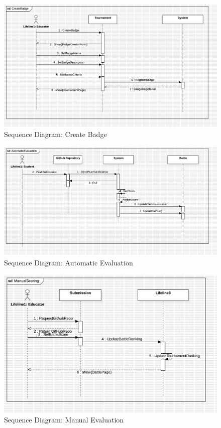 \begin{figure}[Htbp!]
    \centering
    \includegraphics[width=\textwidth]{Graphics/Sequence Diagrams/CreateBadge.png}
    \caption{Sequence Diagram: Create Badge}
    \label{fig:CreateBadge}
\end{figure}
\newpage

\begin{figure}[Htbp!]
    \centering
    \includegraphics[width=\textwidth]{Graphics/Sequence Diagrams/AutomaticEvaluation.png}
    \caption{Sequence Diagram: Automatic Evaluation}
    \label{fig:AutoEval}
\end{figure}


\begin{figure}[Htbp!]
    \centering
    \includegraphics[width=\textwidth]{Graphics/Sequence Diagrams/ManualScoring.png}
    \caption{Sequence Diagram: Manual Evaluation }
    \label{fig:ManEval}
\end{figure}

